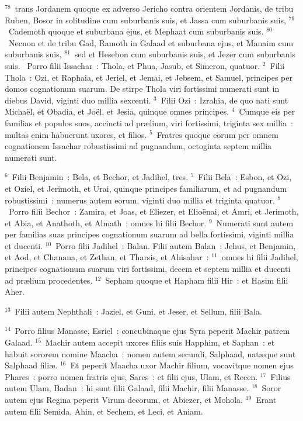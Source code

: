 ${}^{78}$~trans Jordanem quoque ex adverso Jericho contra orientem Jordanis, de tribu Ruben, Bosor in solitudine cum suburbanis suis, et Jassa cum suburbanis suis,
${}^{79}$~Cademoth quoque et suburbana ejus, et Mephaat cum suburbanis suis.
${}^{80}$~Necnon et de tribu Gad, Ramoth in Galaad et suburbana ejus, et Manaim cum suburbanis suis,
${}^{81}$~sed et Hesebon cum suburbanis suis, et Jezer cum suburbanis suis.
~\lettrine[lines=10,image=true,loversize=0.05,lraise=-0.03]{P}{}orro filii Issachar~: Thola, et Phua, Jasub, et Simeron, quatuor.
${}^{2}$~Filii Thola~: Ozi, et Raphaia, et Jeriel, et Jemai, et Jebsem, et Samuel, principes per domos cognationum suarum. De stirpe Thola viri fortissimi numerati sunt in diebus David, viginti duo millia sexcenti.
${}^{3}$~Filii Ozi~: Izrahia, de quo nati sunt Micha\"el, et Obadia, et Jo\"el, et Jesia, quinque omnes principes.
${}^{4}$~Cumque eis per familias et populos suos, accincti ad pr\ae lium, viri fortissimi, triginta sex millia~: multas enim habuerunt uxores, et filios.
${}^{5}$~Fratres quoque eorum per omnem cognationem Issachar robustissimi ad pugnandum, octoginta septem millia numerati sunt.


${}^{6}$~Filii Benjamin~: Bela, et Bechor, et Jadihel, tres.
${}^{7}$~Filii Bela~: Esbon, et Ozi, et Oziel, et Jerimoth, et Urai, quinque principes familiarum, et ad pugnandum robustissimi~: numerus autem eorum, viginti duo millia et triginta quatuor.
${}^{8}$~Porro filii Bechor~: Zamira, et Joas, et Eliezer, et Elio\"enai, et Amri, et Jerimoth, et Abia, et Anathoth, et Almath~: omnes hi filii Bechor.
${}^{9}$~Numerati sunt autem per familias suas principes cognationum suarum ad bella fortissimi, viginti millia et ducenti.
${}^{10}$~Porro filii Jadihel~: Balan. Filii autem Balan~: Jehus, et Benjamin, et Aod, et Chanana, et Zethan, et Tharsis, et Ahisahar~:
${}^{11}$~omnes hi filii Jadihel, principes cognationum suarum viri fortissimi, decem et septem millia et ducenti ad pr\ae lium procedentes.
${}^{12}$~Sepham quoque et Hapham filii Hir~: et Hasim filii Aher.


${}^{13}$~Filii autem Nephthali~: Jaziel, et Guni, et Jeser, et Sellum, filii Bala.


${}^{14}$~Porro filius Manasse, Esriel~: concubinaque ejus Syra peperit Machir patrem Galaad.
${}^{15}$~Machir autem accepit uxores filiis suis Happhim, et Saphan~: et habuit sororem nomine Maacha~: nomen autem secundi, Salphaad, nat\ae que sunt Salphaad fili\ae .
${}^{16}$~Et peperit Maacha uxor Machir filium, vocavitque nomen ejus Phares~: porro nomen fratris ejus, Sares~: et filii ejus, Ulam, et Recen.
${}^{17}$~Filius autem Ulam, Badan~: hi sunt filii Galaad, filii Machir, filii Manasse.
${}^{18}$~Soror autem ejus Regina peperit Virum decorum, et Abiezer, et Mohola.
${}^{19}$~Erant autem filii Semida, Ahin, et Sechem, et Leci, et Aniam.


